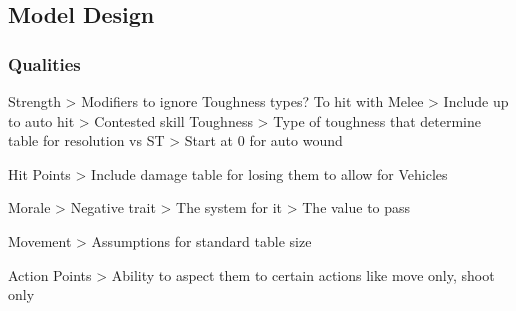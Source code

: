 \begin{multicols*}{2}
	
	\section{Model Design}	
	
	\subsubsection{Qualities}
	
	Strength
	> Modifiers to ignore Toughness types?
	To hit with Melee
	> Include up to auto hit
	> Contested skill
	Toughness
	> Type of toughness that determine table for resolution vs ST
	> Start at 0 for auto wound
	
	Hit Points
	> Include damage table for losing them to allow for Vehicles
	
	Morale
	> Negative trait
	> The system for it
	> The value to pass
	
	Movement
	> Assumptions for standard table size
	
	Action Points
	> Ability to aspect them to certain actions like move only, shoot only
	
	
	
\end{multicols*}